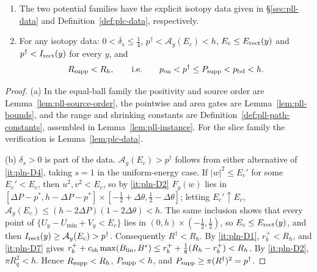 \begin{lemma}\label{lem:pln-data}
\begin{enumerate}[label=(\alph*)]
\item The two potential families have the explicit isotopy data given in
\S\ref{sec:pll-data} and Definition~\ref{def:plc-data}, respectively.
\item For any isotopy data: $0<\delta_s\le\frac14$, $p^\dagger<\mathcal A_y(E_c)<h$,
 $E_c\le E_{\rm rect}(y)$ and $p^\dagger<I_{\rm rect}(y)$ for every $y$, and
 \[
  R_{\rm supp}<R_h,\qquad\text{i.e.}\qquad p_{\rm on}<p^\dagger\le P_{\rm supp}<p_{\rm bd}<h .
 \]
\end{enumerate}
\end{lemma}

\begin{proof}
(a) In the equal-ball family the positivity and source order are
Lemma~\ref{lem:pll-source-order}, the pointwise and area gates are
Lemma~\ref{lem:pll-bounds}, and the range and shrinking constants are
Definition~\ref{def:pll-path-constants}, assembled in Lemma~\ref{lem:pll-instance}. For the slice family the
verification is Lemma~\ref{lem:plc-data}.

(b) $\delta_s>0$ is part of the data. $\mathcal A_y(E_c)>p^\dagger$ follows from either alternative of \ref{it:pln-D4}, taking $s=1$ in the uniform-energy case. If $|w|^2\le E_c'$ for
some $E_c'<E_c$, then $u^2,v^2<E_c$, so by \ref{it:pln-D2} $F_y(w)$ lies in
$[\Delta P-p^*,h-\Delta P-p^*]\times[-\frac12+\Delta\theta,\frac12-\Delta\theta]$; letting $E_c'\uparrow E_c$,
$\mathcal A_y(E_c)\le(h-2\Delta P)(1-2\Delta\theta)<h$. The same inclusion shows that every point of
$\{U_y-U_{\min}+V_y<E_c\}$ lies in $(0,h)\times(-\frac12,\frac12)$, so $E_c\le E_{\rm rect}(y)$, and then
$I_{\rm rect}(y)\ge\mathcal A_y(E_c)>p^\dagger$. Consequently $R^\dagger<R_h$. By \ref{it:pln-D1}, $r_b^+<R_h$, and
\ref{it:pln-D7} gives $r_b^++c_{\rm sh}\max(B_{\rm lin},B^*)\le r_b^++\frac18(R_h-r_b^+)<R_h$. By \ref{it:pln-D2}, $\pi R_q^2<h$.
Hence $R_{\rm supp}<R_h$, $P_{\rm supp}<h$, and $P_{\rm supp}\ge\pi(R^\dagger)^2=p^\dagger$.
\end{proof}

